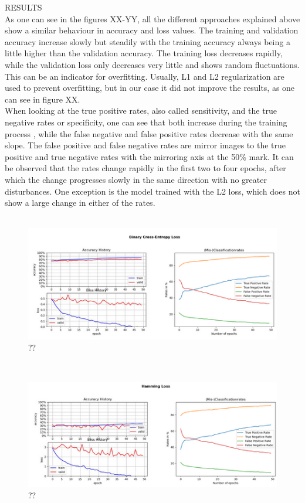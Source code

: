 RESULTS \\
As one can see in the figures XX-YY, all the different approaches explained above show a similar behaviour in accuracy and loss values. The training and validation accuracy increase slowly but steadily with the training accuracy always being a little higher than the validation accuracy. The training loss decreases rapidly, while the validation loss only decreases very little and shows random fluctuations. This can be an indicator for overfitting. Usually, L1 and L2 regularization are used to prevent overfitting, but in our case it did not improve the results, as one can see in figure XX. \\
When looking at the true positive rates, also called sensitivity, and the true negative rates or specificity, one can see that both increase during the training process , while the false negative and false positive rates decrease with the same slope. The false positive and false negative rates are mirror images to the true positive and true negative rates with the mirroring axis at the 50\% mark. It can be observed that the rates change rapidly in the first two to four epochs, after which the change progresses slowly in the same direction with no greater disturbances. One exception is the model trained with the L2 loss, which does not show a large change in either of the rates. \\
\\
\begin{figure}[h]
	\centering
	\includegraphics[scale=0.8]{Figures/chapter04/multi_crossent}
	\decoRule
	\caption[??]{??}
	\label{fig:MultilabelCrossentropy}
\end{figure}
\\
\begin{figure}[h]
	\centering
	\includegraphics[scale=0.8]{Figures/chapter04/multi_ham}
	\decoRule
	\caption[??]{??}
	\label{fig:MultilabelHammingLoss}
\end{figure}
